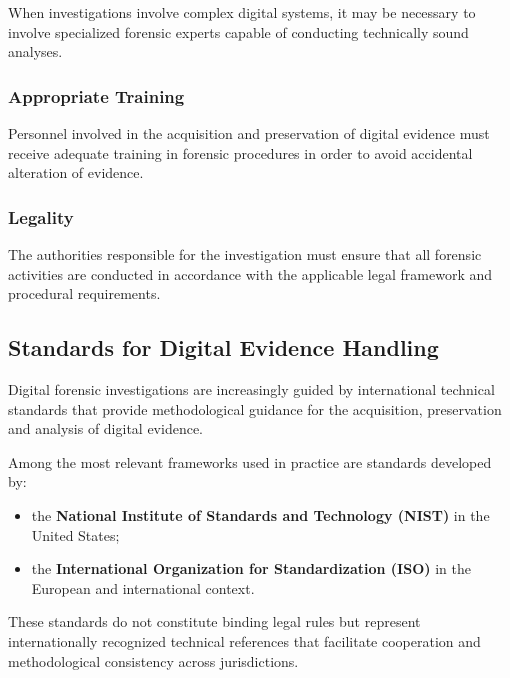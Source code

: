 \noindent
When investigations involve complex digital systems, it may be necessary to involve specialized forensic experts capable of conducting technically sound analyses.

\medskip

\subsubsection*{Appropriate Training}

\noindent
Personnel involved in the acquisition and preservation of digital evidence must receive adequate training in forensic procedures in order to avoid accidental alteration of evidence.

\medskip

\subsubsection*{Legality}

\noindent
The authorities responsible for the investigation must ensure that all forensic activities are conducted in accordance with the applicable legal framework and procedural requirements.


\subsection{Standards for Digital Evidence Handling}

\noindent
Digital forensic investigations are increasingly guided by international technical standards that provide methodological guidance for the acquisition, preservation and analysis of digital evidence.

\medskip

\noindent
Among the most relevant frameworks used in practice are standards developed by:

\begin{itemize}
\item the \textbf{National Institute of Standards and Technology (NIST)} in the United States;
\item the \textbf{International Organization for Standardization (ISO)} in the European and international context.
\end{itemize}

\medskip

\noindent
These standards do not constitute binding legal rules but represent internationally recognized technical references that facilitate cooperation and methodological consistency across jurisdictions.


